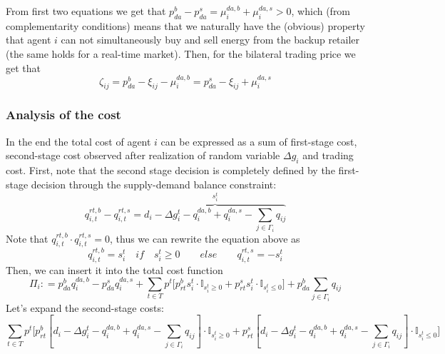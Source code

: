 \documentclass{article}
\begin{document}
From first two equations we get that $p^{b}_{da} - p^s_{da} = \mu^{da,b}_i + \mu^{da,s}_i > 0$, which (from complementarity conditions) means that we naturally have the (obvious) property that agent $i$ can not simultaneously buy and sell energy from the backup retailer (the same holds for a real-time market). Then, for the bilateral trading price we get that 
\begin{equation}
    \zeta_{ij} = p^b_{da} - \xi_{ij} - \mu^{da,b}_i = p^s_{da} - \xi_{ij} + \mu^{da,s}_i
\end{equation}

\subsubsection{Analysis of the cost}
In the end the total cost of agent $i$ can be expressed as a sum of first-stage cost, second-stage cost observed after realization of random variable $\Delta g_i$ and trading cost. First, note that the second stage decision is completely defined by the first-stage decision through the supply-demand balance constraint:
\begin{equation}
    q^{rt, b}_{i, t} - q^{rt, s}_{i,t} = \overbrace{d_i - \Delta g^t_i - q^{da,b}_i + q^{da,s}_i - \sum_{j \in \Gamma_i} q_{ij}}^{s^t_i}
\end{equation}
Note that $q^{rt, b}_{i, t} \cdot q^{rt, s}_{i,t} = 0$, thus we can rewrite the equation above as 
\begin{equation}
    q^{rt, b}_{i, t} = s^t_i \quad  if \quad s^t_i \geq 0 \qquad else \qquad q^{rt, s}_{i, t} = -s^t_i
\end{equation} 
Then, we can insert it into the total cost function 
\begin{equation}
    \Pi_i : = p^b_{da} q^{da,b}_i - p^s_{da} q^{da,s}_i + \sum_{t \in T} p^t \big[ p^b_{rt} s^t_i \cdot \mathbb{I}_{s^t_i \geq 0} + p^s_{rt} s^t_i \cdot \mathbb{I}_{s^t_i \leq 0} \big] + p^b_{da} \sum_{j \in \Gamma_i} q_{ij}
\end{equation}
Let's expand the second-stage costs:
\begin{equation}
    \sum_{t \in T} p^t \big[ p^b_{rt} [d_i - \Delta g^t_i - q^{da,b}_i + q^{da,s}_i - \sum_{j \in \Gamma_i} q_{ij}] \cdot \mathbb{I}_{s^t_i \geq 0} + p^s_{rt} [d_i - \Delta g^t_i - q^{da,b}_i + q^{da,s}_i - \sum_{j \in \Gamma_i} q_{ij}] \cdot \mathbb{I}_{s^t_i \leq 0} \big]
\end{equation}
\end{document}
